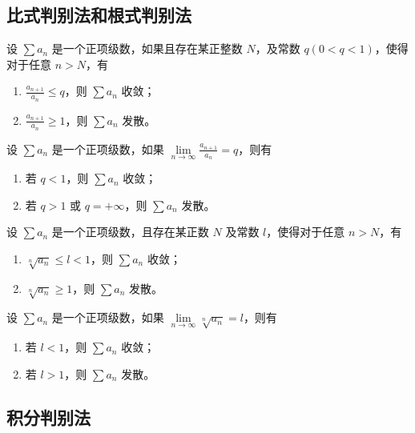 \subsection{比式判别法和根式判别法}

\begin{theorem}[比式判别法]
    设 $\sum a_{n}$ 是一个正项级数，如果且存在某正整数 $N$，及常数 $q(0<q<1)$，使得对于任意 $n > N$，有
    \begin{enumerate}
        \item $\frac{a_{n+1}}{a_{n}} \leq q$，则 $\sum a_{n}$ 收敛；
        \item $\frac{a_{n+1}}{a_{n}} \geq 1$，则 $\sum a_{n}$ 发散。
    \end{enumerate}
\end{theorem}

\begin{theorem}[比式判别法的极限形式]
    设 $\sum a_{n}$ 是一个正项级数，如果 $\lim\limits_{n \to \infty} \frac{a_{n+1}}{a_{n}} = q$，则有
    \begin{enumerate}
        \item 若 $q < 1$，则 $\sum a_{n}$ 收敛；
        \item 若 $q > 1$ 或 $q = +\infty$，则 $\sum a_{n}$ 发散。
    \end{enumerate}
\end{theorem}

\begin{theorem}[根式判别法]
    设 $\sum a_{n}$ 是一个正项级数，且存在某正数 $N$ 及常数 $l$，使得对于任意 $n > N$，有
    \begin{enumerate}
        \item $\sqrt[n]{a_{n}} \leq l < 1$，则 $\sum a_{n}$ 收敛；
        \item $\sqrt[n]{a_{n}} \geq 1$，则 $\sum a_{n}$ 发散。
    \end{enumerate}
\end{theorem}

\begin{theorem}[根式判别法的极限形式]
    设 $\sum a_{n}$ 是一个正项级数，如果 $\lim\limits_{n \to \infty} \sqrt[n]{a_{n}} = l$，则有
    \begin{enumerate}
        \item 若 $l < 1$，则 $\sum a_{n}$ 收敛；
        \item 若 $l > 1$，则 $\sum a_{n}$ 发散。
    \end{enumerate}
\end{theorem}

\subsection{积分判别法}


